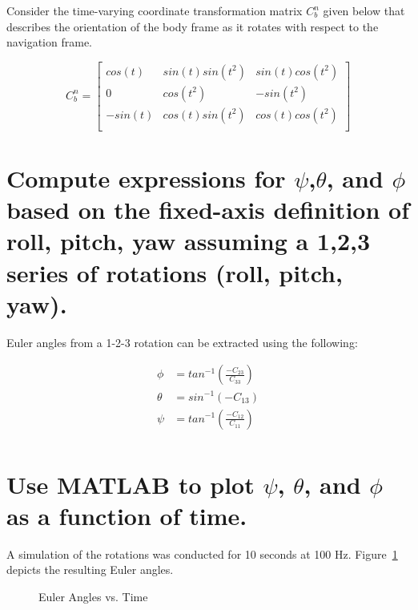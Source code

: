 
\question
Consider the time-varying coordinate transformation matrix $C^{n}_{b}$ given below that describes the orientation of the body frame as it rotates with respect to the navigation frame.

\[C^n_b =
    \begin{bmatrix}
        cos(t)  & sin(t)sin(t^2)  & sin(t)cos(t^2) \\
        0       & cos(t^2)        & -sin(t^2)      \\
        -sin(t) & cos(t) sin(t^2) & cos(t)cos(t^2) \\
    \end{bmatrix} \]

\begin{parts}

    \part{Compute expressions for $\psi$,$\theta$, and $\phi$ based on the fixed-axis definition of roll, pitch, yaw assuming a 1,2,3 series of rotations (roll, pitch, yaw).}

    \solution
    Euler angles from a 1-2-3 rotation can be extracted using the following:

    \begin{equation*}
        \begin{split}
            \phi & = tan^{-1}\left(\frac{-C_{23}}{C_{33}}\right) \\
            \theta & = sin^{-1}(-C_{13})\\
            \psi & = tan^{-1}\left(\frac{-C_{12}}{C_{11}}\right)\\
        \end{split}
    \end{equation*}

    \part{Use MATLAB to plot $\psi$, $\theta$, and $\phi$ as a function of time.}

    A simulation of the rotations was conducted for 10 seconds at 100 Hz. Figure~\ref*{fig:euler} depicts the resulting Euler angles.

    \begin{figure}[!ht]
        \centering
        
        \caption{Euler Angles vs. Time}
        \label{fig:euler}
    \end{figure}

\end{parts}